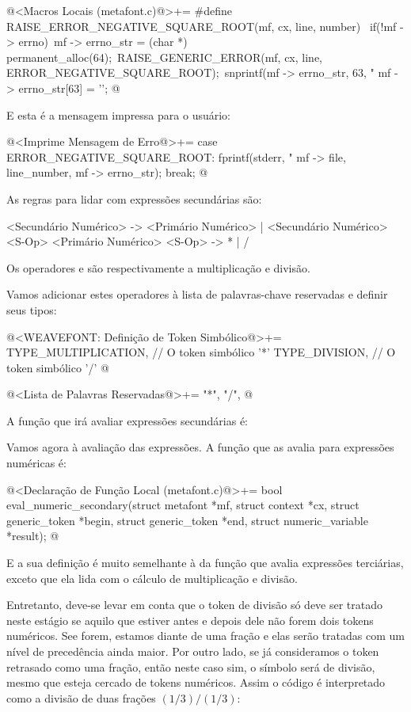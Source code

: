 \iniciocodigo
@<Macros Locais (metafont.c)@>+=
#define RAISE_ERROR_NEGATIVE_SQUARE_ROOT(mf, cx, line, number) {\
  if(!mf -> errno){\
    mf -> errno_str = (char *) permanent_alloc(64);\
    RAISE_GENERIC_ERROR(mf, cx, line, ERROR_NEGATIVE_SQUARE_ROOT);\
    snprintf(mf -> errno_str, 63, "%
    mf -> errno_str[63] = '\0';}}
@
\fimcodigo

E esta é a mensagem impressa para o usuário:

\iniciocodigo
@<Imprime Mensagem de Erro@>+=
case ERROR_NEGATIVE_SQUARE_ROOT:
  fprintf(stderr, "%
          mf -> file, line_number, mf -> errno_str);
  break;
@
\fimcodigo


As regras para lidar com expressões secundárias são:

\alinhaverbatim
<Secundário Numérico> -> <Primário Numérico> |
                         <Secundário Numérico> <S-Op> <Primário Numérico>
<S-Op> -> * | /
\alinhanormal

Os operadores \monoespaco{*} e \monoespaco{/} são respectivamente a
multiplicação e divisão.

Vamos adicionar estes operadores à lista de palavras-chave reservadas
e definir seus tipos:

\iniciocodigo
@<WEAVEFONT: Definição de Token Simbólico@>+=
TYPE_MULTIPLICATION,        // O token simbólico '*'
TYPE_DIVISION,              // O token simbólico '/'
@
\fimcodigo

\iniciocodigo
@<Lista de Palavras Reservadas@>+=
"*", "/",
@
\fimcodigo

A função que irá avaliar expressões secundárias é:

Vamos agora à avaliação das expressões. A função que as avalia para
expressões numéricas é:

\iniciocodigo
@<Declaração de Função Local (metafont.c)@>+=
bool eval_numeric_secondary(struct metafont *mf, struct context *cx,
                            struct generic_token *begin,
                            struct generic_token *end,
                            struct numeric_variable *result);
@
\fimcodigo

E a sua definição é muito semelhante à da função que avalia expressões
terciárias, exceto que ela lida com o cálculo de multiplicação e
divisão.

Entretanto, deve-se levar em conta que o token de divisão só deve ser
tratado neste estágio se aquilo que estiver antes e depois dele não
forem dois tokens numéricos. See forem, estamos diante de uma fração e
elas serão tratadas com um nível de precedência ainda maior. Por outro
lado, se já consideramos o token retrasado como uma fração, então
neste caso sim, o símbolo será de divisão, mesmo que esteja cercado de
tokens numéricos. Assim o código \monoespaco{1/3/1/3} é interpretado
como a divisão de duas frações $(1/3)/(1/3)$:



